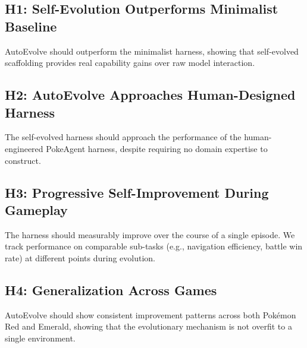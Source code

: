 
\subsection{H1: Self-Evolution Outperforms Minimalist Baseline}

AutoEvolve should outperform the minimalist harness, showing that self-evolved scaffolding provides real capability gains over raw model interaction.


\subsection{H2: AutoEvolve Approaches Human-Designed Harness}

The self-evolved harness should approach the performance of the human-engineered PokeAgent harness, despite requiring no domain expertise to construct.


\subsection{H3: Progressive Self-Improvement During Gameplay}

The harness should measurably improve over the course of a single episode. We track performance on comparable sub-tasks (e.g., navigation efficiency, battle win rate) at different points during evolution.


\subsection{H4: Generalization Across Games}

AutoEvolve should show consistent improvement patterns across both Pok\'{e}mon Red and Emerald, showing that the evolutionary mechanism is not overfit to a single environment.

